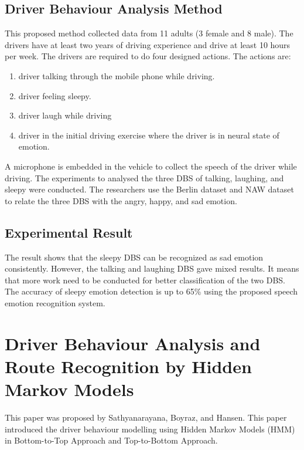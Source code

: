 \subsection{Driver Behaviour Analysis Method}
This proposed method collected data from 11 adults (3 female and 8 male). The drivers have at least two years of driving experience and drive at least 10 hours per week. The drivers are required to do four designed actions. The actions are: 
\begin{enumerate}
\item driver talking through the mobile phone while driving.
\item driver feeling sleepy.
\item driver laugh while driving
\item driver in the initial driving exercise where the driver is in neural state of emotion.
\end{enumerate}

A microphone is embedded in the vehicle to collect the speech of the driver while driving. The experiments to analysed the three DBS of talking, laughing, and sleepy were conducted. The researchers use the Berlin dataset and NAW dataset to relate the three DBS with the angry, happy, and sad emotion.

\subsection{Experimental Result}
The result shows that the sleepy DBS can be recognized as sad emotion consistently. However, the talking and laughing DBS gave mixed results. It means that more work need to be conducted for better classification of the two DBS. The accuracy of sleepy emotion detection is up to 65\% using the proposed speech emotion recognition system.

\section{Driver Behaviour Analysis and Route Recognition by Hidden Markov Models}
This paper was proposed by Sathyanarayana, Boyraz, and Hansen\citeyear{sath:2008}. This paper introduced the driver behaviour modelling using Hidden Markov Models (HMM) in Bottom-to-Top Approach and Top-to-Bottom Approach.

